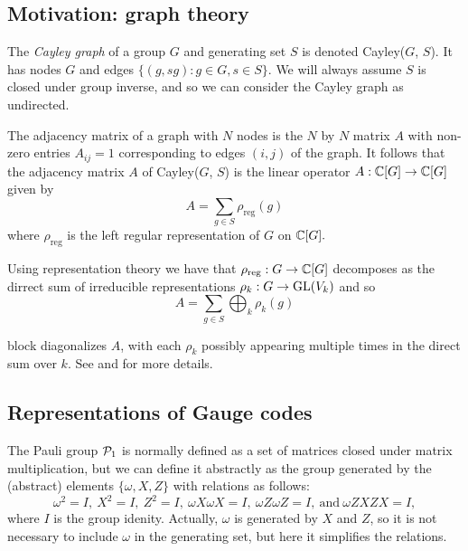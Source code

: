 \documentclass[12pt,notitlepage,longbibliography,nofootinbib,tightenlines]{revtex4}
\begin{document}
%
%

\subsection{Motivation: graph theory}

\def\rhoreg{\rho_\mathrm{reg}}

The {\it Cayley graph} of a group $G$ and
generating set $S$ is denoted Cayley($G$, $S$).
It has nodes $G$ and edges $\{(g, sg) : g \in G, s \in S\}$.
We will always assume $S$ is closed under group inverse,
and so we can consider the Cayley graph as undirected.

The adjacency matrix of a graph with $N$ nodes is the 
$N$ by $N$ matrix $A$ with non-zero entries $A_{ij}=1$ corresponding
to edges $(i, j)$ of the graph.
It follows that the adjacency matrix $A$ of Cayley($G$, $S$)
is the linear operator $A:\mathbb{C}[G]\to\mathbb{C}[G]$
given by
$$
    A = \sum_{g\in S}\rho_{\mathrm{reg}}(g)
$$
where $\rho_{\mathrm{reg}}$ is the left regular representation of
$G$ on $\mathbb{C}[G].$

Using representation theory we have that 
$\rhoreg:G\to \Complex[G]$
decomposes as the dirrect sum of irreducible
representations $\rho_k:G\to \mathrm{GL}(V_k)$
and so
$$
    A = \sum_{g\in S}\bigoplus_k \rho_k(g)
$$

block diagonalizes $A$,
with each $\rho_k$ possibly appearing multiple
times in the direct sum over $k$.
See \cite{Diaconis1981} and \cite{Kaski2002} for more details.

%
%

\subsection{Representations of Gauge codes}

The Pauli group $\mathcal{P}_1$ is normally 
defined as a set of matrices closed under
matrix multiplication, but we can define
it abstractly
as the group generated
by the (abstract) elements $\{\omega, X, Z\}$ with
relations as follows:
$$
\omega^2=I,\ X^2=I,\ Z^2=I,\ \omega X\omega X=I,\ \omega Z\omega Z=I,\ \mbox{and}\  \omega ZXZX=I,
$$
where $I$ is the group idenity.
Actually, $\omega $ is generated by $X$ and $Z$, so
it is not necessary to include $\omega $ in the generating set,
but here it simplifies the relations.
\end{document}
